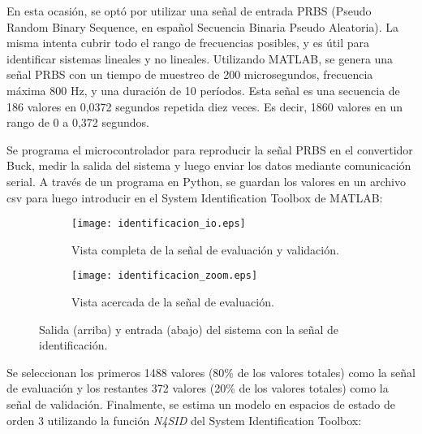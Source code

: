 En esta ocasión, se optó por utilizar una señal de entrada PRBS
(Pseudo Random Binary Sequence, en español Secuencia Binaria Pseudo Aleatoria). La misma intenta
cubrir todo el rango de frecuencias posibles, y es útil para identificar sistemas lineales y no lineales.
Utilizando MATLAB, se genera una señal PRBS con un tiempo de muestreo de 200 microsegundos, frecuencia máxima
800 Hz, y una duración de 10 períodos. Esta señal es una secuencia de 186 valores en 0,0372 segundos repetida diez veces.
Es decir, 1860 valores en un rango de 0 a 0,372 segundos.

Se programa el microcontrolador para reproducir la señal PRBS en el convertidor Buck, medir la salida
del sistema y luego enviar los datos mediante comunicación serial. A través de un programa en Python, se guardan
los valores en un archivo csv para luego introducir en el System Identification Toolbox de MATLAB:


\begin{figure}[H]
    \centering

    \begin{subfigure}[b]{\textwidth}
        \centering
        \texttt{[image: identificacion\_io.eps]}
        \caption{Vista completa de la señal de evaluación y validación.}
        \label{fig:identificacion_io_gral}
    \end{subfigure}
    \begin{subfigure}[b]{\textwidth}
        \centering
        \texttt{[image: identificacion\_zoom.eps]}
        \caption{Vista acercada de la señal de evaluación.}
        \label{fig:identificacion_io_zoom}
    \end{subfigure}

    \vspace{-0.25cm}
    \caption{Salida (arriba) y entrada (abajo) del sistema con la señal de identificación.}
    \label{fig:identificacion_io}
\end{figure}
\vspace{-0.5cm}

Se seleccionan los primeros 1488 valores (80\% de los valores totales) como la señal de evaluación
y los restantes 372 valores (20\% de los valores totales) como la señal de validación. Finalmente,
se estima un modelo en espacios de estado de orden 3 utilizando la función \textit{N4SID} del System Identification Toolbox:

